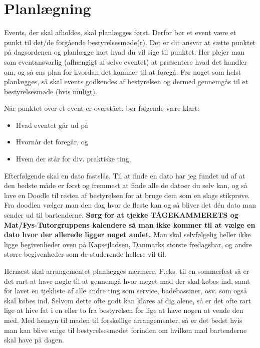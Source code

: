 \section*{Planlægning}
\label{sec:det-praktiske}

Events, der skal afholdes, skal planlægges først. Derfor bør et event være et punkt til det/de forgående bestyrelsesmøde(r). Det er dit ansvar at sætte punktet på dagsordenen og planlægge kort hvad du vil sige til punktet. Her plejer man som eventansvarlig (afhængigt af selve eventet) at præsentere hvad det handler om, og så ens plan for hvordan det kommer til at foregå. Før noget som helst planlægges, så skal events godkendes af bestyrelsen og dermed gennemgås til et bestyrelsesmøde (hvis muligt).

Når punktet over et event er overstået, bør følgende være klart:
\begin{itemize}
\item Hvad eventet går ud på
\item Hvornår det foregår, og
\item Hvem der står for div. praktiske ting.
\end{itemize}

\noindent Efterfølgende skal en dato fastslås. Til at finde en dato har jeg fundet ud af at den bedste måde er først og fremmest at finde alle de datoer du selv kan, og så lave en Doodle til resten af bestyrelsen for at bruge dem som en slags stikprøve. Fra doodlen vælger man den dag hvor de fleste kan og så bliver det dén dato man sender ud til bartenderne. \textbf{Sørg for at tjekke TÅGEKAMMERETS og Mat/Fys-Tutorgruppens kalendere så man ikke kommer til at vælge en dato hvor der allerede ligger noget andet.} Man skal selvfølgelig heller ikke ligge begivenheder oven på Kapsejladsen, Danmarks største fredagsbar, og andre større begivenheder som de studerende hellere vil til.

Hernæst skal arrangementet planlægges nærmere. F.eks. til en sommerfest så er det rart at have nogle til at gennemgå hvor meget mad der skal købes ind, samt for lavet en tjekliste af alle andre ting som service, badebassiner, osv. som også skal købes ind. Selvom dette ofte godt kan klares af dig alene, så er det ofte rart lige at hive fat i en eller to fra bestyrelsen for lige at have nogen at vende den med. Med hensyn til maden til forskellige arrangementer, så er det bedst hvis man kan blive enige til bestyrelsesmødet forinden om hvilken mad bartenderne skal have på dagen.

